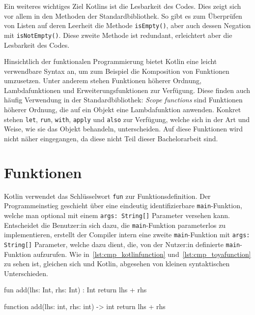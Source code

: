 Ein weiteres wichtiges Ziel Kotlins ist die Lesbarkeit des Codes. Dies zeigt sich vor allem in den Methoden der Standardbibliothek. So gibt es zum Überprüfen von Listen auf deren Leerheit die Methode \texttt{isEmpty()}, aber auch dessen Negation mit \texttt{isNotEmpty()}. Diese zweite Methode ist redundant, erleichtert aber die Lesbarkeit des Codes.

Hinsichtlich der funktionalen Programmierung bietet Kotlin eine leicht verwendbare Syntax an, um zum Beispiel die Komposition von Funktionen umzusetzen. Unter anderem stehen Funktionen höherer Ordnung, Lambdafunktionen und Erweiterungsfunktionen zur Verfügung. Diese finden auch häufig Verwendung in der Standardbibliothek: \textit{Scope functions} sind Funktionen höherer Ordnung, die auf ein Objekt eine Lambdafunktion anwenden. Konkret stehen \texttt{let}, \texttt{run}, \texttt{with}, \texttt{apply} und \texttt{also} zur Verfügung, welche sich in der Art und Weise, wie sie das Objekt behandeln, unterscheiden. Auf diese Funktionen wird nicht näher eingegangen, da diese nicht Teil dieser Bachelorarbeit sind.

\section{Funktionen}

Kotlin verwendet das Schlüsselwort \texttt{fun} zur Funktionsdefinition. Der Programmeinstieg geschieht über eine eindeutig identifizierbare \texttt{main}-Funktion, welche man optional mit einem \texttt{args: String[]} Parameter versehen kann. Entscheidet die Benutzer:in sich dazu, die \texttt{main}-Funktion parameterlos zu implementieren, erstellt der Compiler intern eine zweite \texttt{main}-Funktion mit \texttt{args: String[]} Parameter, welche dazu dient, die, von der Nutzer:in definierte \texttt{main}-Funktion aufzurufen. Wie in~\autoref{lst:cmp_kotlinfunction} und~\autoref{lst:cmp_toyafunction} zu sehen ist, gleichen sich \toya und Kotlin, abgesehen von kleinen syntaktischen Unterschieden.

\begin{KotlinCode}[numbers=none, caption={Funktion unter Kotlin}, label=lst:cmp_kotlinfunction]
fun add(lhs: Int, rhs: Int) : Int {
    return lhs + rhs
}
\end{KotlinCode}

\begin{ToyaCode}[numbers=none, caption={Funktion unter \toya}, label=lst:cmp_toyafunction]
function add(lhs: int, rhs: int) -> int {
    return lhs + rhs
}
\end{ToyaCode}

